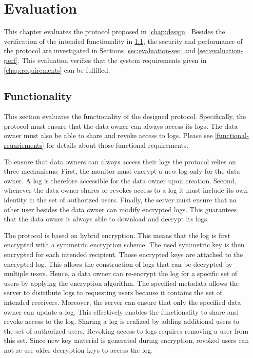 \documentclass[../main.tex]{subfiles}
\begin{document}
\chapter{Evaluation}
\label{chap:evaluation}

This chapter evaluates the protocol proposed in \cref{chap:design}.
Besides the verification of the intended functionality in \cref{sec:evaluation-func}, the security and performance of the protocol are investigated in Sections \ref{sec:evaluation-sec} and \ref{sec:evaluation-perf}.
This evaluation verifies that the system requirements given in \cref{chap:requirements} can be fulfilled.

\section{Functionality}
\label{sec:evaluation-func}

This section evaluates the functionality of the designed protocol.
Specifically, the protocol must ensure that the data owner can always access its logs.
The data owner must also be able to share and revoke access to logs.
Please see \cref{functional-requriements} for details about those functional requirements.

To ensure that data owners can always access their logs the protocol relies on three mechanisms:
First, the monitor must encrypt a new log only for the data owner.
A log is therefore accessible for the data owner upon creation.
Second, whenever the data owner shares or revokes access to a log it must include its own identity in the set of authorized users.
Finally, the server must ensure that no other user besides the data owner can modify encrypted logs.
This guarantees that the data owner is always able to download and decrypt its logs.

The protocol is based on hybrid encryption.
This means that the log is first encrypted with a symmetric encryption scheme.
The used symmetric key is then encrypted for each intended recipient.
Those encrypted keys are attached to the encrypted log.
This allows the construction of logs that can be decrypted by multiple users.
Hence, a data owner can re-encrypt the log for a specific set of users by applying the encryption algorithm.
The specified metadata allows the server to distribute logs to requesting users because it contains the set of intended receivers.
Moreover, the server can ensure that only the specified data owner can update a log.
This effectively enables the functionality to share and revoke access to the log.
Sharing a log is realized by adding additional users to the set of authorized users.
Revoking access to logs requires removing a user from this set.
Since new key material is generated during encryption, revoked users can not re-use older decryption keys to access the log.
\end{document}

